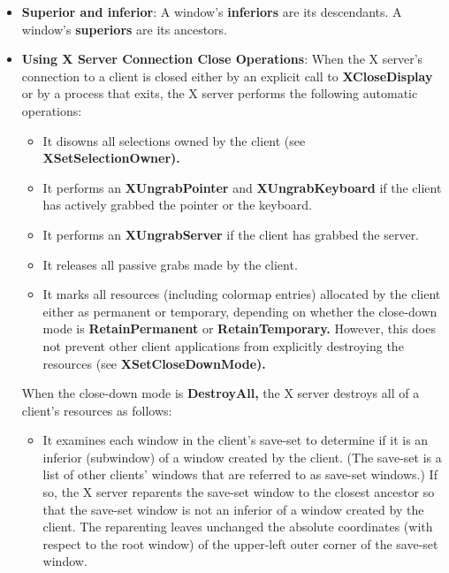 \documentclass{report}
\begin{document}
\begin{itemize}
            If the window manager exits or its connection to the X server closes, the server automatically reparents those save-set windows, usually back to a safe ancestor such as the root, and maps them if appropriate.
            \bigbreak \noindent 
            You can remove a window from the save-set with
            \bigbreak \noindent 
            \begin{cppcode}
            XRemoveFromSaveSet(display, client_window);
            \end{cppcode}
        \item \textbf{Superior and inferior}: A window's \textbf{inferiors} are its descendants. A window's \textbf{superiors} are its ancestors.
        \item \textbf{Using X Server Connection Close Operations}: When the X server’s connection to a client is closed either by an explicit call to \textbf{XCloseDisplay} or by a process that exits, the X server performs the following automatic operations:
            \begin{itemize}
                \item It disowns all selections owned by the client (see \textbf{XSetSelectionOwner).}
                \item It performs an \textbf{XUngrabPointer} and \textbf{XUngrabKeyboard} if the client has actively grabbed the pointer or the keyboard.
                \item It performs an \textbf{XUngrabServer} if the client has grabbed the server.
                \item It releases all passive grabs made by the client.
                \item It marks all resources (including colormap entries) allocated by the client either as permanent or temporary, depending on whether the close-down mode is \textbf{RetainPermanent} or \textbf{RetainTemporary.} However, this does not prevent other client applications from explicitly destroying the resources (see \textbf{XSetCloseDownMode).}
            \end{itemize}
            When the close-down mode is \textbf{DestroyAll,} the X server destroys all of a client’s resources as follows:
            \begin{itemize}
                \item It examines each window in the client’s save-set to determine if it is an inferior (subwindow) of a window created by the client. (The save-set is a list of other clients’ windows that are referred to as save-set windows.) If so, the X server reparents the save-set window to the closest ancestor so that the save-set window is not an inferior of a window created by the client. The reparenting leaves unchanged the absolute coordinates (with respect to the root window) of the upper-left outer corner of the save-set window.

\end{itemize}
\end{itemize}
\end{document}
